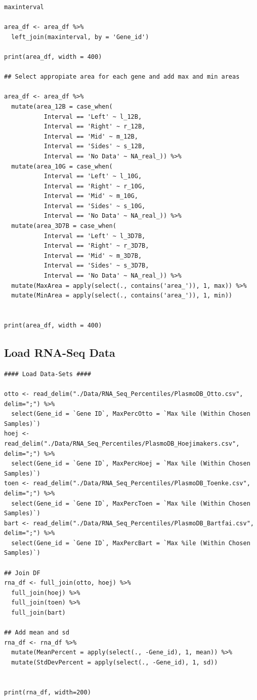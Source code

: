 \documentclass[11pt]{article}
\begin{document}
\begin{verbatim}
maxinterval

area_df <- area_df %>%
  left_join(maxinterval, by = 'Gene_id')

print(area_df, width = 400)

## Select appropiate area for each gene and add max and min areas

area_df <- area_df %>%
  mutate(area_12B = case_when(
           Interval == 'Left' ~ l_12B,
           Interval == 'Right' ~ r_12B,
           Interval == 'Mid' ~ m_12B,
           Interval == 'Sides' ~ s_12B,
           Interval == 'No Data' ~ NA_real_)) %>%
  mutate(area_10G = case_when(
           Interval == 'Left' ~ l_10G,
           Interval == 'Right' ~ r_10G,
           Interval == 'Mid' ~ m_10G,
           Interval == 'Sides' ~ s_10G,
           Interval == 'No Data' ~ NA_real_)) %>%
  mutate(area_3D7B = case_when(
           Interval == 'Left' ~ l_3D7B,
           Interval == 'Right' ~ r_3D7B,
           Interval == 'Mid' ~ m_3D7B,
           Interval == 'Sides' ~ s_3D7B,
           Interval == 'No Data' ~ NA_real_)) %>%
  mutate(MaxArea = apply(select(., contains('area_')), 1, max)) %>%
  mutate(MinArea = apply(select(., contains('area_')), 1, min))


print(area_df, width = 400)
\end{verbatim}
\subsection{Load RNA-Seq Data}
\label{sec:org75b23b3}

\begin{verbatim}
#### Load Data-Sets ####

otto <- read_delim("./Data/RNA_Seq_Percentiles/PlasmoDB_Otto.csv", delim=";") %>%
  select(Gene_id = `Gene ID`, MaxPercOtto = `Max %ile (Within Chosen Samples)`)
hoej <- read_delim("./Data/RNA_Seq_Percentiles/PlasmoDB_Hoejimakers.csv", delim=";") %>%
  select(Gene_id = `Gene ID`, MaxPercHoej = `Max %ile (Within Chosen Samples)`)
toen <- read_delim("./Data/RNA_Seq_Percentiles/PlasmoDB_Toenke.csv", delim=";") %>%
  select(Gene_id = `Gene ID`, MaxPercToen = `Max %ile (Within Chosen Samples)`)
bart <- read_delim("./Data/RNA_Seq_Percentiles/PlasmoDB_Bartfai.csv", delim=";") %>%
  select(Gene_id = `Gene ID`, MaxPercBart = `Max %ile (Within Chosen Samples)`)

## Join DF
rna_df <- full_join(otto, hoej) %>%
  full_join(hoej) %>%
  full_join(toen) %>%
  full_join(bart)

## Add mean and sd
rna_df <- rna_df %>%
  mutate(MeanPercent = apply(select(., -Gene_id), 1, mean)) %>%
  mutate(StdDevPercent = apply(select(., -Gene_id), 1, sd))


print(rna_df, width=200)
\end{verbatim}
\end{document}
